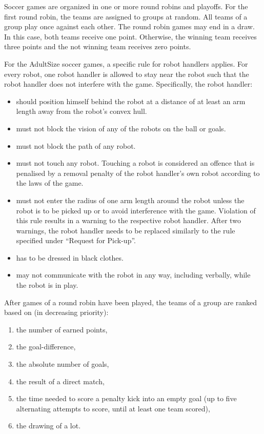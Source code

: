 \bigskip

Soccer games are organized in one or more round robins and playoffs. For the first round robin, the teams are assigned to groups at random. All teams of a group play once against each other. The round robin games may end in a draw. In this case, both teams receive one point. Otherwise, the winning team receives three points and the not winning team receives zero points.

\bigskip

For the AdultSize soccer games, a specific rule for robot handlers applies. For every robot, one robot handler is allowed to stay near the robot such that the robot handler does not interfere with the game. Specifically, the robot handler:
\begin{itemize}
\item should position himself behind the robot at a distance of at least an arm length away from the robot's convex hull.
\item must not block the vision of any of the robots on the ball or goals.
\item must not block the path of any robot.
\item must not touch any robot. Touching a robot is considered an offence that is penalised by a removal penalty of the robot handler's own robot according to the laws of the game.
\item must not enter the radius of one arm length around the robot unless the robot is to be picked up or to avoid interference with the game. Violation of this rule results in a warning to the respective robot handler. After two warnings, the robot handler needs to be replaced similarly to the rule specified under ``Request for Pick-up''.
\item has to be dressed in black clothes.
\item may not communicate with the robot in any way, including verbally, while the robot is in play.
\end{itemize}
\color{black}

\bigskip

After games of a round robin have been played, the teams of a group are ranked based on (in decreasing priority): 

\begin{enumerate}
\item the number of earned points,
\item the goal-difference,
\item the absolute number of goals,
\item the result of a direct match,
\item the time needed to score a penalty kick into an empty goal (up to five alternating attempts to score, until at least one team scored),
\item the drawing of a lot.
\end{enumerate}

